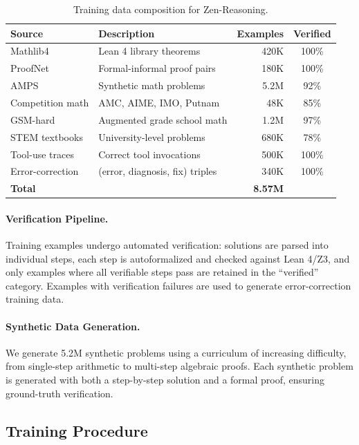 \documentclass[11pt,a4paper]{article}
\begin{document}
\begin{table}[t]
\centering
\caption{Training data composition for Zen-Reasoning.}
\label{tab:data}
\begin{tabular}{llrc}
\toprule
\textbf{Source} & \textbf{Description} & \textbf{Examples} & \textbf{Verified} \\
\midrule
Mathlib4 & Lean 4 library theorems & 420K & 100\% \\
ProofNet & Formal-informal proof pairs & 180K & 100\% \\
AMPS & Synthetic math problems & 5.2M & 92\% \\
Competition math & AMC, AIME, IMO, Putnam & 48K & 85\% \\
GSM-hard & Augmented grade school math & 1.2M & 97\% \\
STEM textbooks & University-level problems & 680K & 78\% \\
Tool-use traces & Correct tool invocations & 500K & 100\% \\
Error-correction & (error, diagnosis, fix) triples & 340K & 100\% \\
\midrule
\multicolumn{2}{l}{\textbf{Total}} & \textbf{8.57M} & \\
\bottomrule
\end{tabular}
\end{table}

\paragraph{Verification Pipeline.} Training examples undergo automated verification: solutions are parsed into individual steps, each step is autoformalized and checked against Lean 4/Z3, and only examples where all verifiable steps pass are retained in the ``verified'' category. Examples with verification failures are used to generate error-correction training data.

\paragraph{Synthetic Data Generation.} We generate 5.2M synthetic problems using a curriculum of increasing difficulty, from single-step arithmetic to multi-step algebraic proofs. Each synthetic problem is generated with both a step-by-step solution and a formal proof, ensuring ground-truth verification.

\subsection{Training Procedure}
\label{sec:training_procedure}
\end{document}
